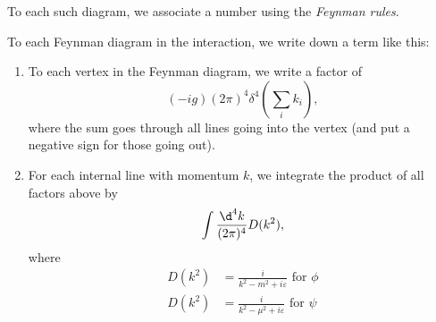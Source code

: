 \documentclass[a4paper]{article}
\begin{document}
To each such diagram, we associate a number using the \emph{Feynman rules}.
\begin{defi}
  To each Feynman diagram in the interaction, we write down a term like this:
  \begin{enumerate}
    \item To each vertex in the Feynman diagram, we write a factor of
      \[
        (-ig)(2\pi)^4 \delta^4\left(\sum_i k_i\right),
      \]
      where the sum goes through all lines going into the vertex (and put a negative sign for those going out).
    \item For each internal line with momentum $k$, we integrate the product of all factors above by
      \[
        \int \frac{\d^4 k}{(2\pi)^4} D(k^2),
      \]
      where
      \begin{align*}
        D(k^2) &= \frac{i}{k^2 - m^2 + i\varepsilon}\text{ for }\phi\\
        D(k^2) &= \frac{i}{k^2 - \mu^2 + i\varepsilon}\text{ for }\psi
      \end{align*}
  \end{enumerate}
\end{defi}
\end{document}
